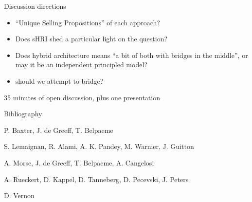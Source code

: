 \documentclass[compress]{beamer}
\begin{document}
\begin{frame}{Discussion directions}

    \begin{itemize}

    \item ``Unique Selling Propositions'' of each approach?
    \item Does sHRI shed a particular light on the question?
    \item Does {\Medium hybrid architecture} means ``a bit of
        both with bridges in the middle'', or may it be an independent principled
        model?
    \item should we attempt to bridge?

    \end{itemize}

    35 minutes of open discussion, plus one presentation

\end{frame}

\begin{frame}{Bibliography}
\begin{thebibliography}{10}
\footnotesize
    \beamertemplatearticlebibitems
    P. Baxter, J. de Greeff, T. Belpaeme
    \newblock {}


    \beamertemplatearticlebibitems
    S. Lemaignan, R. Alami, A. K. Pandey, M. Warnier, J. Guitton
    \newblock {}

    \beamertemplatearticlebibitems
    A. Morse, J. de Greeff, T. Belpaeme, A. Cangelosi
    \newblock {}

    \beamertemplatearticlebibitems
    A. Rueckert, D. Kappel, D. Tanneberg, D. Pecevski, J. Peters
    \newblock {}


    \beamertemplatebookbibitems
    D. Vernon
    \newblock {}


  \end{thebibliography}
\end{frame}
\end{document}
